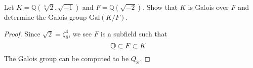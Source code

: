 \begin{prob}[F2010-Q3]
    Let \(K = \mathbb{Q}(\sqrt[8]{2}, \sqrt{-1})\) and \(F = \mathbb{Q}(\sqrt{-2})\). Show that \(K\) is Galois over \(F\) and determine the Galois group \(\text{Gal}(K/F)\).
\end{prob}
\begin{proof}
    Since $\sqrt{2}=\zeta_8^4$, we see $F$ is a subfield such that 
    \begin{equation*}
        \mathbb{Q}\subset F\subset K
    \end{equation*}
    The Galois group can be computed to be $Q_8$.


\end{proof}

